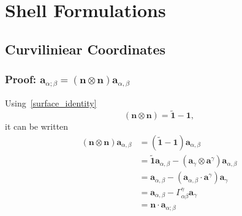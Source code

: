 
\chapter{Shell Formulations} %

\label{AppendixB} %

\section{Curviliniear Coordinates}
    \subsection{Proof: \texorpdfstring{$\boldsymbol{a}_{\alpha;\beta} = (\boldsymbol{n} \otimes \boldsymbol{n}) \boldsymbol{a}_{\alpha, \beta}$}{Cov Derivative}}
    Using~\eqref{surface_identity}
    \begin{equation}\label{eq:eq12}
        \left( \boldsymbol{n} \otimes \boldsymbol{n} \right) = \boldsymbol{\tilde{1}} - \boldsymbol{1},
    \end{equation}
    it can be written     
    \begin{equation}\label{appendices:cov_tangent_derivative}
        \begin{split}
            \left( \boldsymbol{n} \otimes \boldsymbol{n} \right) \boldsymbol{a}_{\alpha, \beta} &= \left( \boldsymbol{\tilde{1}} - \boldsymbol{1} \right) \boldsymbol{a}_{\alpha, \beta} \\ &= \boldsymbol{\tilde{1}} \boldsymbol{a}_{\alpha, \beta} - \left( \boldsymbol{a}_{\gamma} \otimes \boldsymbol{a}^{\gamma} \right) \boldsymbol{a}_{\alpha, \beta} \\
            &= \boldsymbol{a}_{\alpha, \beta} - \left( \boldsymbol{a}_{\alpha, \beta} \cdot \boldsymbol{a}^{\gamma}\right) \boldsymbol{a}_{\gamma} \\
            &= \boldsymbol{a}_{\alpha, \beta} - \Gamma_{\alpha \beta}^{\gamma} \boldsymbol{a}_{\gamma}\\
            &= \boldsymbol{n} \cdot \boldsymbol{a}_{\alpha ; \beta}
        \end{split}
    \end{equation}
